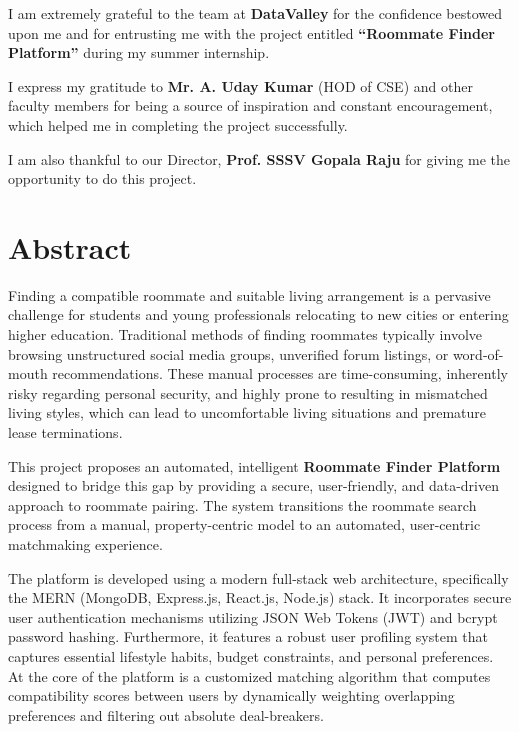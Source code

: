 \documentclass[12pt,a4paper]{report}
\begin{document}
I am extremely grateful to the team at \textbf{DataValley} for the confidence bestowed upon me and for entrusting me with the project entitled \textbf{``Roommate Finder Platform''} during my summer internship.

I express my gratitude to \textbf{Mr. A. Uday Kumar} (HOD of CSE) and other faculty members for being a source of inspiration and constant encouragement, which helped me in completing the project successfully.

I am also thankful to our Director, \textbf{Prof. SSSV Gopala Raju} for giving me the opportunity to do this project.
\newpage

\tableofcontents
\newpage

\listoffigures
{}
\newpage

\listoftables
{}
\newpage

\chapter*{Abstract}
Finding a compatible roommate and suitable living arrangement is a pervasive challenge for students and young professionals relocating to new cities or entering higher education. Traditional methods of finding roommates typically involve browsing unstructured social media groups, unverified forum listings, or word-of-mouth recommendations. These manual processes are time-consuming, inherently risky regarding personal security, and highly prone to resulting in mismatched living styles, which can lead to uncomfortable living situations and premature lease terminations. 

This project proposes an automated, intelligent \textbf{Roommate Finder Platform} designed to bridge this gap by providing a secure, user-friendly, and data-driven approach to roommate pairing. The system transitions the roommate search process from a manual, property-centric model to an automated, user-centric matchmaking experience. 

The platform is developed using a modern full-stack web architecture, specifically the MERN (MongoDB, Express.js, React.js, Node.js) stack. It incorporates secure user authentication mechanisms utilizing JSON Web Tokens (JWT) and bcrypt password hashing. Furthermore, it features a robust user profiling system that captures essential lifestyle habits, budget constraints, and personal preferences. At the core of the platform is a customized matching algorithm that computes compatibility scores between users by dynamically weighting overlapping preferences and filtering out absolute deal-breakers.
\end{document}
